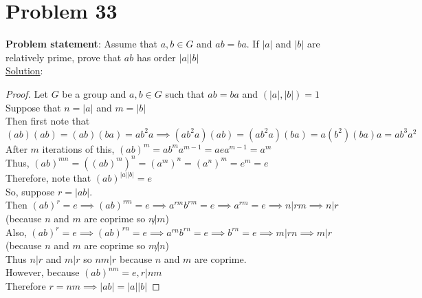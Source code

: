 \documentclass{article} %
\begin{document}
\section*{Problem 33}


\textbf{Problem statement}: Assume that $a,b \in G$ and $ab = ba$.  If $|a|$ and $|b|$ are relatively prime, prove that $ab$ has order $|a||b|$
\\

\underline{Solution}: 
\begin{addmargin}[1em]{0em}
\begin{proof}
Let $G$ be a group and $a,b \in G$ such that $ab = ba$ and $(|a|,|b|) = 1$
\\Suppose that $n = |a|$ and $m = |b|$
\\Then first note that $(ab)(ab) = (ab)(ba) = ab^2a \implies (ab^2a)(ab) = (ab^2a)(ba) = a(b^2)(ba)a = ab^3a^2$
\\After $m$ iterations of this, $(ab)^m = ab^ma^{m-1} = aea^{m-1} = a^m$
\\Thus, $(ab)^{mn} = ((ab)^m)^n = (a^m)^n = (a^n)^m = e^m = e$
\\Therefore, note that $(ab)^{|a||b|} = e$
\\So, suppose $r = |ab|$.
\\Then $(ab)^r = e \implies (ab)^{rm} = e \implies a^{rm}b^{rm} = e \implies a^{rm} = e \implies n|rm \implies n|r$ (because $n$ and $m$ are coprime so $n \not| m$)
\\Also, $(ab)^r = e \implies (ab)^{rn} = e \implies a^{rn}b^{rn} = e \implies b^{rn} = e \implies m|rn \implies m|r$ (because $n$ and $m$ are coprime so $m \not| n$)
\\Thus $n|r$ and $m|r$ so $nm|r$ because $n$ and $m$ are coprime.
\\However, because $(ab)^{nm} = e, r|nm$
\\Therefore $r = nm \implies |ab| = |a||b|$
\end{proof}
\end{addmargin}    

\newpage
\end{document}
